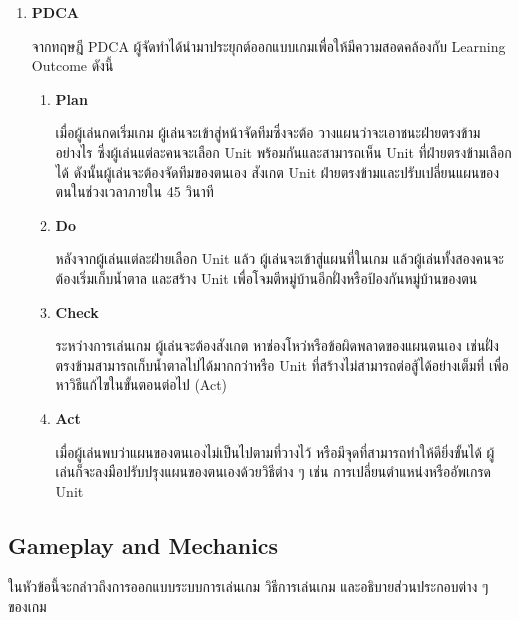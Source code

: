 \documentclass[12pt,oneside,openright,a4paper]{cpe-thai-project}
\begin{document}
\begin{enumerate}
  \item \textbf{PDCA}
    
    จากทฤษฎี PDCA ผู้จัดทำได้นำมาประยุกต์ออกแบบเกมเพื่อให้มีความสอดคล้องกับ Learning Outcome ดังนี้
  \begin{enumerate}
    \item \textbf{Plan}

    เมื่อผู้เล่นกดเริ่มเกม ผู้เล่นจะเข้าสู่หน้าจัดทีมซึ่งจะต้อ วางแผนว่าจะเอาชนะฝ่ายตรงข้ามอย่างไร 
    ซึ่งผู้เล่นแต่ละคนจะเลือก Unit พร้อมกันและสามารถเห็น Unit ที่ฝ่ายตรงข้ามเลือกได้ 
    ดังนั้นผู้เล่นจะต้องจัดทีมของตนเอง สังเกต Unit ฝ่ายตรงข้ามและปรับเปลี่ยนแผนของตนในช่วงเวลาภายใน 45 วินาที

    \item \textbf{Do}
    
    หลังจากผู้เล่นแต่ละฝ่ายเลือก Unit แล้ว ผู้เล่นจะเข้าสู่แผนที่ในเกม แล้วผู้เล่นทั้งสองคนจะต้องเริ่มเก็บน้ำตาล
    และสร้าง Unit เพื่อโจมตีหมู่บ้านอีกฝั่งหรือป้องกันหมู่บ้านของตน

    \item \textbf{Check}
    
    ระหว่างการเล่นเกม ผู้เล่นจะต้องสังเกต หาช่องโหว่หรือข้อผิดพลาดของแผนตนเอง 
    เช่นฝั่งตรงข้ามสามารถเก็บน้ำตาลไปได้มากกว่าหรือ Unit ที่สร้างไม่สามารถต่อสู้ได้อย่างเต็มที่ 
    เพื่อหาวิธีแก้ไขในขั้นตอนต่อไป (Act)

    \item \textbf{Act}
    
    เมื่อผู้เล่นพบว่าแผนของตนเองไม่เป็นไปตามที่วางไว้ หรือมีจุดที่สามารถทำให้ดียิ่งขั้นได้ 
    ผู้เล่นก็จะลงมือปรับปรุงแผนของตนเองด้วยวิธีต่าง ๆ เช่น การเปลี่ยนตำแหน่งหรืออัพเกรด Unit

  \end{enumerate}
\end{enumerate}

\pagebreak
\subsection{Gameplay and Mechanics}
ในหัวข้อนี้จะกล่าวถึงการออกแบบระบบการเล่นเกม วิธีการเล่นเกม และอธิบายส่วนประกอบต่าง ๆ ของเกม\\
\end{document}
